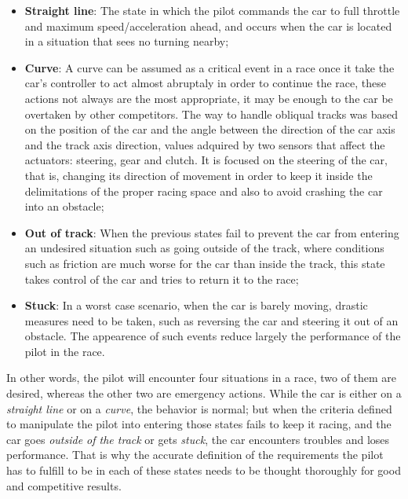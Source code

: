 \begin{itemize}
	\item \textbf{Straight line}: The state in which the pilot commands the car to full throttle and maximum 
	speed/acceleration ahead, and occurs when the car is located in a situation that sees no turning nearby;
	
	\item \textbf{Curve}: A curve can be assumed as a critical event in a race once it take the car's controller
	to act almost abruptaly in order to continue the race, these actions not always are the most appropriate, it
	may be enough to the car be overtaken by other competitors. The way to handle obliqual tracks was based 
	on the position of the car and the angle between the direction of the car axis and the track axis direction, 
	values adquired by two sensors that affect the actuators: steering, gear and clutch. It is focused on the 
	steering of the car, that is, changing its direction of movement in order to keep it inside the delimitations 
	of the proper racing space and also to avoid crashing the car into an obstacle;
	
	\item \textbf{Out of track}: When the previous states fail to prevent the car from entering an undesired situation
	such as going outside of the track, where conditions such as friction are much worse for the car than inside the
	track, this state takes control of the car and tries to return it to the race;
	
	\item \textbf{Stuck}: In a worst case scenario, when the car is barely moving, drastic measures need to be taken,
	such as reversing the car and steering it out of an obstacle. The appearence of such events reduce largely the
	performance of the pilot in the race.
\end{itemize}

	In other words, the pilot will encounter four situations in a race, two of them are desired, whereas the other two are 
	emergency actions. While the car is either on a \emph{straight line} or on a \emph{curve}, the behavior is normal; 
	but when the criteria defined to manipulate the pilot into entering those states fails to keep it racing, and the car 
	goes \emph{outside of the track} or gets \emph{stuck}, the car encounters troubles and loses performance. That is why
	the accurate definition of the requirements the pilot has to fulfill to be in each of these states needs to be thought 
	thoroughly for good and competitive results.


